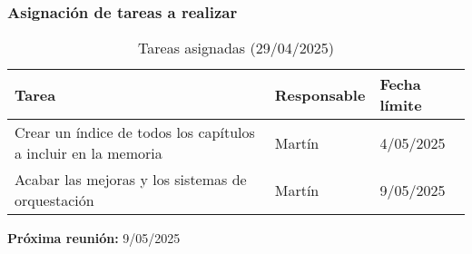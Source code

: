 \subsubsection{Asignación de tareas a realizar}
\begin{table}[h]
    \centering
    \begin{tabular}{|p{8cm}|p{3cm}|p{3cm}|}
        \hline
        \textbf{Tarea} & \textbf{Responsable} & \textbf{Fecha límite} \\
        \hline
        Crear un índice de todos los capítulos a incluir en la memoria & Martín & 4/05/2025 \\
        \hline
        Acabar las mejoras y los sistemas de orquestación & Martín & 9/05/2025 \\
        \hline
    \end{tabular}
    \caption{Tareas asignadas (29/04/2025)}
\end{table}

\textbf{Próxima reunión:} 9/05/2025
